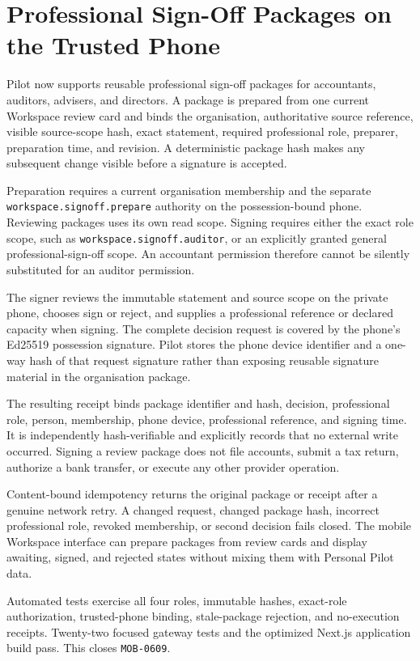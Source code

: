 \section{Professional Sign-Off Packages on the Trusted Phone}
\label{sec:pilot-mobile-professional-signoff}
\raggedright

Pilot now supports reusable professional sign-off packages for accountants, auditors, advisers,
and directors.  A package is prepared from one current Workspace review card and binds the
organisation, authoritative source reference, visible source-scope hash, exact statement,
required professional role, preparer, preparation time, and revision.  A deterministic package
hash makes any subsequent change visible before a signature is accepted.

Preparation requires a current organisation membership and the separate
\texttt{workspace.signoff.prepare} authority on the possession-bound phone.  Reviewing packages
uses its own read scope.  Signing requires either the exact role scope, such as
\texttt{workspace.signoff.auditor}, or an explicitly granted general professional-sign-off scope.
An accountant permission therefore cannot be silently substituted for an auditor permission.

The signer reviews the immutable statement and source scope on the private phone, chooses sign or
reject, and supplies a professional reference or declared capacity when signing.  The complete
decision request is covered by the phone's Ed25519 possession signature.  Pilot stores the phone
device identifier and a one-way hash of that request signature rather than exposing reusable
signature material in the organisation package.

The resulting receipt binds package identifier and hash, decision, professional role, person,
membership, phone device, professional reference, and signing time.  It is independently
hash-verifiable and explicitly records that no external write occurred.  Signing a review package
does not file accounts, submit a tax return, authorize a bank transfer, or execute any other
provider operation.

Content-bound idempotency returns the original package or receipt after a genuine network retry.
A changed request, changed package hash, incorrect professional role, revoked membership, or second
decision fails closed.  The mobile Workspace interface can prepare packages from review cards and
display awaiting, signed, and rejected states without mixing them with Personal Pilot data.

Automated tests exercise all four roles, immutable hashes, exact-role authorization, trusted-phone
binding, stale-package rejection, and no-execution receipts.  Twenty-two focused gateway tests and
the optimized Next.js application build pass.  This closes \texttt{MOB-0609}.
